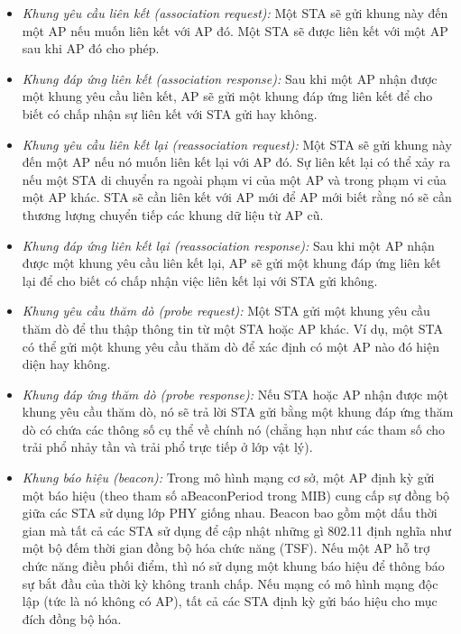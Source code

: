 \begin{itemize}
\item \emph{Khung yêu cầu liên kết (association request):} \tab Một STA sẽ gửi khung này đến một AP nếu muốn liên kết với AP đó. Một STA sẽ được liên kết với một AP sau khi AP đó cho phép.

\item \emph{Khung đáp ứng liên kết (association response):} \tab Sau khi một AP nhận được một khung yêu cầu liên kết, AP sẽ gửi một khung đáp ứng liên kết để cho biết có chấp nhận sự liên kết với STA gửi hay không.

\item \emph{Khung yêu cầu liên kết lại (reassociation request):} \tab Một STA sẽ gửi khung này đến một AP nếu nó muốn liên kết lại với AP đó. Sự liên kết lại có thể xảy ra nếu một STA di chuyển ra ngoài phạm vi của một AP và trong phạm vi của một AP khác. STA sẽ cần liên kết với AP mới để AP mới biết rằng nó sẽ cần thương lượng chuyển tiếp các khung dữ liệu từ AP cũ.

\item \emph{Khung đáp ứng liên kết lại (reassociation response):} \tab Sau khi một AP nhận được một khung yêu cầu liên kết lại, AP sẽ gửi một khung đáp ứng liên kết lại để cho biết có chấp nhận việc liên kết lại với STA gửi không.

\item \emph{Khung yêu cầu thăm dò (probe request):} \tab Một STA gửi một khung yêu cầu thăm dò để thu thập thông tin từ một STA hoặc AP khác. Ví dụ, một STA có thể gửi một khung yêu cầu thăm dò để xác định có một AP nào đó hiện diện hay không.

\item \emph{Khung đáp ứng thăm dò (probe response):} \tab Nếu STA hoặc AP nhận được một khung yêu cầu thăm dò, nó sẽ trả lời STA gửi bằng một khung đáp ứng thăm dò có chứa các thông số cụ thể về chính nó (chẳng hạn như các tham số cho trải phổ nhảy tần và trải phổ trực tiếp ở lớp vật lý).

\item \emph{Khung báo hiệu (beacon):} \tab Trong mô hình mạng cơ sở, một AP định kỳ gửi một báo hiệu (theo tham số aBeaconPeriod trong MIB) cung cấp sự đồng bộ giữa các STA sử dụng lớp PHY giống nhau. Beacon bao gồm một dấu thời gian mà tất cả các STA sử dụng để cập nhật những gì 802.11 định nghĩa như một bộ đếm thời gian đồng bộ hóa chức năng (TSF). Nếu một AP hỗ trợ chức năng điều phối điểm, thì nó sử dụng một khung báo hiệu để thông báo sự bắt đầu của thời kỳ không tranh chấp. Nếu mạng có mô hình mạng độc lập (tức là nó không có AP), tất cả các STA định kỳ gửi báo hiệu cho mục đích đồng bộ hóa.


\end{itemize}
